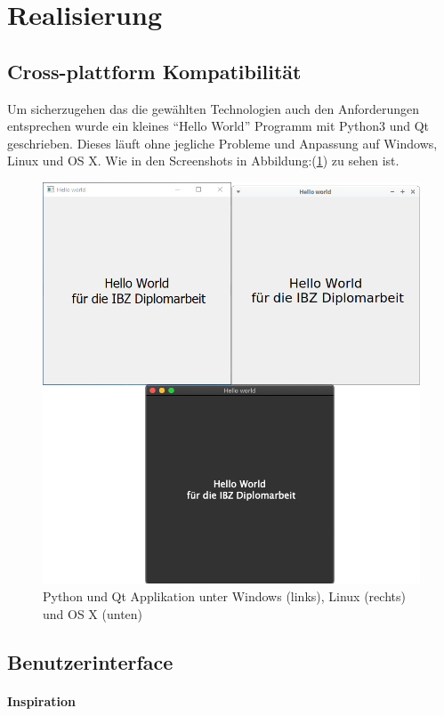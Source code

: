 \section{Realisierung}
\label{sec:orgab64221}
\subsection{Cross-plattform Kompatibilität}
\label{sec:orgd126eea}

Um sicherzugehen das die gewählten Technologien auch den Anforderungen
entsprechen wurde ein kleines "`Hello World"' Programm mit Python3 und Qt
geschrieben. Dieses läuft ohne jegliche Probleme und Anpassung auf Windows,
Linux und OS X. Wie in den Screenshots in Abbildung:(\ref{fig:org935d9c3}) zu sehen
ist.

\begin{figure}[htbp]
\centering
\includegraphics[width=.9\linewidth]{pictures/hello_world.png}
\caption{\label{fig:org935d9c3}
Python und Qt Applikation unter Windows (links), Linux (rechts) und OS X (unten)}
\end{figure}

\subsection{Benutzerinterface}
\label{sec:org440a6bb}
\paragraph{Inspiration}
\label{sec:org9d63d07}

